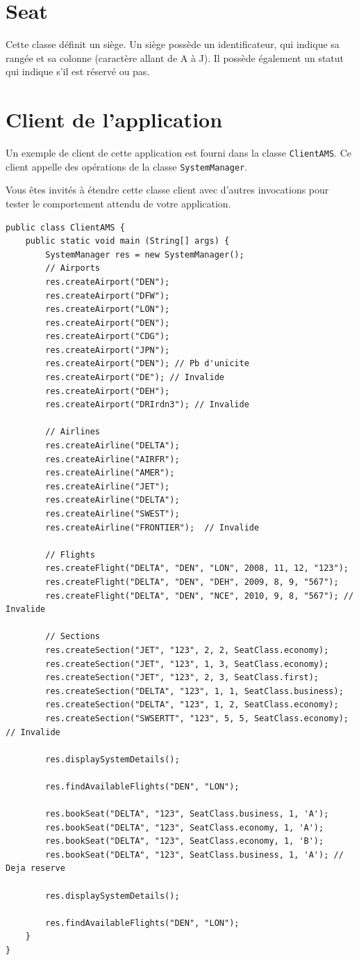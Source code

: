 \documentclass[a4paper,12pt,francais,twoside]{article}
\begin{document}
\section{Seat}
Cette classe définit un siège. Un siège possède un identificateur, qui indique sa rangée
et sa colonne (caractère allant de A à J). Il possède également un statut qui indique 
s'il est réservé ou pas.

\section{Client de l'application}
Un exemple de client de cette application est fourni dans la classe \texttt{ClientAMS}.
Ce client appelle des opérations de la classe \texttt{SystemManager}.

Vous êtes invités à étendre cette classe client avec d'autres invocations pour
tester le comportement attendu de votre application.

\begin{lstlisting}
public class ClientAMS {
    public static void main (String[] args) {
        SystemManager res = new SystemManager();
		// Airports
		res.createAirport("DEN");
		res.createAirport("DFW");
		res.createAirport("LON");
		res.createAirport("DEN");
		res.createAirport("CDG");
		res.createAirport("JPN");
		res.createAirport("DEN"); // Pb d'unicite
		res.createAirport("DE"); // Invalide
		res.createAirport("DEH");
		res.createAirport("DRIrdn3"); // Invalide
		
		// Airlines
		res.createAirline("DELTA");
		res.createAirline("AIRFR");
		res.createAirline("AMER");
		res.createAirline("JET");
		res.createAirline("DELTA");
		res.createAirline("SWEST");
		res.createAirline("FRONTIER");  // Invalide
		
		// Flights
		res.createFlight("DELTA", "DEN", "LON", 2008, 11, 12, "123");
		res.createFlight("DELTA", "DEN", "DEH", 2009, 8, 9, "567");
		res.createFlight("DELTA", "DEN", "NCE", 2010, 9, 8, "567"); // Invalide
		
		// Sections
		res.createSection("JET", "123", 2, 2, SeatClass.economy);
		res.createSection("JET", "123", 1, 3, SeatClass.economy);
		res.createSection("JET", "123", 2, 3, SeatClass.first);
		res.createSection("DELTA", "123", 1, 1, SeatClass.business);
		res.createSection("DELTA", "123", 1, 2, SeatClass.economy);
		res.createSection("SWSERTT", "123", 5, 5, SeatClass.economy); // Invalide
		
		res.displaySystemDetails();
		
		res.findAvailableFlights("DEN", "LON");
		
		res.bookSeat("DELTA", "123", SeatClass.business, 1, 'A');
		res.bookSeat("DELTA", "123", SeatClass.economy, 1, 'A');
		res.bookSeat("DELTA", "123", SeatClass.economy, 1, 'B');
		res.bookSeat("DELTA", "123", SeatClass.business, 1, 'A'); // Deja reserve
		
		res.displaySystemDetails();
		
		res.findAvailableFlights("DEN", "LON");
    }
}
\end{lstlisting}
\end{document}
